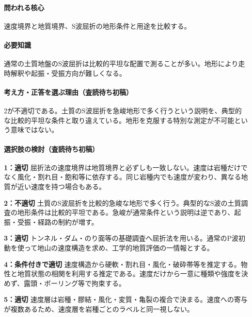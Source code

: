 \paragraph{問われる核心} 速度境界と地質境界、S波屈折の地形条件と用途を比較する。

\paragraph{必要知識} 通常の土質地盤のS波屈折は比較的平坦な配置で測ることが多い。地形により走時解釈や起振・受振方向が難しくなる。

\paragraph{考え方・正答を選ぶ理由（査読待ち初稿）} 2が不適切である。土質のS波屈折を急峻地形で多く行うという説明を、典型的な比較的平坦な条件と取り違えている。地形を克服する特別な測定が不可能という意味ではない。

\paragraph{選択肢の検討（査読待ち初稿）}\mbox{}\par

\noindent\textbf{1：適切} 屈折法の速度境界は地質境界と必ずしも一致しない。速度は岩種だけでなく風化・割れ目・飽和等に依存する。同じ岩種内でも速度が変わり、異なる地質が近い速度を持つ場合もある。\par

\noindent\textbf{2：不適切} 土質のS波屈折を比較的急峻な地形で多く行う。典型的なS波の土質調査の地形条件は比較的平坦である。急峻が通常条件という説明は逆であり、起振・受振・経路の制約が増す。\par

\noindent\textbf{3：適切} トンネル・ダム・のり面等の基礎調査へ屈折法を用いる。通常のP波初動を使って地山の速度構造を求め、工学的地質評価の一情報とする。\par

\noindent\textbf{4：条件付きで適切} 速度構造から硬軟・割れ目・風化・破砕帯等を推定する。物性と地質状態の相関を利用する推定である。速度だけから一意に種類や強度を決めず、露頭・ボーリング等で拘束する。\par

\noindent\textbf{5：適切} 速度層は岩種・膠結・風化・変質・亀裂の複合で決まる。速度への寄与が複数あるため、速度層を岩種ごとのラベルと同一視しない。\par


